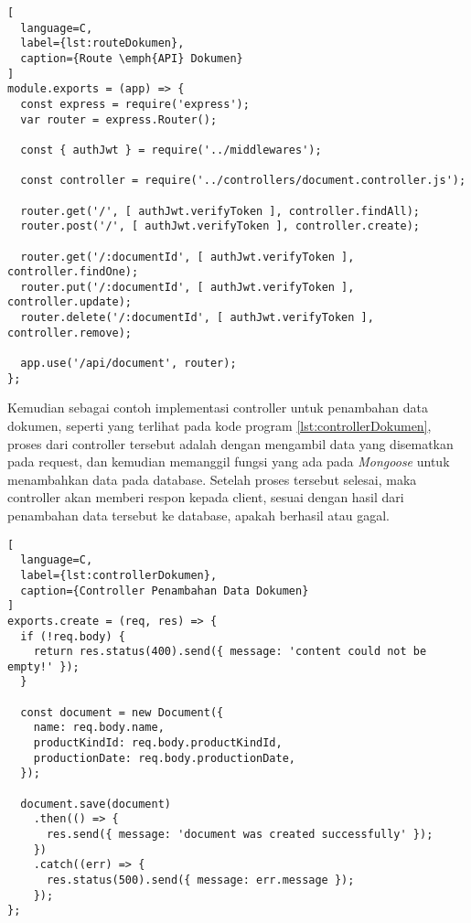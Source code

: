 \begin{lstlisting}[
  language=C,
  label={lst:routeDokumen},
  caption={Route \emph{API} Dokumen}
]
module.exports = (app) => {
  const express = require('express');
  var router = express.Router();

  const { authJwt } = require('../middlewares');

  const controller = require('../controllers/document.controller.js');

  router.get('/', [ authJwt.verifyToken ], controller.findAll);
  router.post('/', [ authJwt.verifyToken ], controller.create);

  router.get('/:documentId', [ authJwt.verifyToken ], controller.findOne);
  router.put('/:documentId', [ authJwt.verifyToken ], controller.update);
  router.delete('/:documentId', [ authJwt.verifyToken ], controller.remove);

  app.use('/api/document', router);
};
\end{lstlisting}
\vspace{0.5ex}

Kemudian sebagai contoh implementasi controller untuk penambahan data dokumen, seperti yang terlihat pada kode program \ref{lst:controllerDokumen}, proses dari controller tersebut adalah dengan mengambil data yang disematkan pada request, dan kemudian memanggil fungsi yang ada pada \emph{Mongoose} untuk menambahkan data pada database.
Setelah proses tersebut selesai, maka controller akan memberi respon kepada client, sesuai dengan hasil dari penambahan data tersebut ke database, apakah berhasil atau gagal.
\vspace{0.5ex}

\begin{lstlisting}[
  language=C,
  label={lst:controllerDokumen},
  caption={Controller Penambahan Data Dokumen}
]
exports.create = (req, res) => {
  if (!req.body) {
    return res.status(400).send({ message: 'content could not be empty!' });
  }

  const document = new Document({
    name: req.body.name,
    productKindId: req.body.productKindId,
    productionDate: req.body.productionDate,
  });

  document.save(document)
    .then(() => {
      res.send({ message: 'document was created successfully' });
    })
    .catch((err) => {
      res.status(500).send({ message: err.message });
    });
};
\end{lstlisting}
\vspace{0.5ex}

